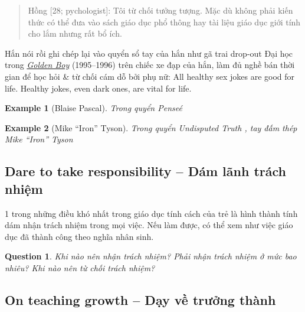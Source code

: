 \documentclass[12pt]{article}
\newtheorem{example}{Example}
\newtheorem{question}{Question}
\begin{document}
\begin{quote}
	{\sf Hồng [28; pychologist]}: Tôi từ chối tưởng tượng. Mặc dù không phải kiến thức có thể đưa vào sách giáo dục phổ thông hay tài liệu giáo dục giới tính cho lắm nhưng rất bổ ích.
\end{quote}
Hắn nói rồi ghi chép lại vào quyển sổ tay của hắn như gã trai drop-out Đại học trong \href{https://www.imdb.com/title/tt0159145/}{\it Golden Boy} (1995--1996) trên chiếc xe đạp của hắn, làm đủ nghề bán thời gian để học hỏi \& từ chối cám dỗ bởi phụ nữ: All healthy sex jokes are good for life. Healthy jokes, even dark ones, are vital for life.

\begin{example}[\sc Blaise Pascal]\rm
	Trong quyển {\it Pense\'e} \cite{Pascal2003}
\end{example}

\begin{example}[\sc Mike ``Iron'' Tyson]\rm
	Trong quyển {\it Undisputed Truth} \cite{Tyson_Sloman2013}, tay đấm thép Mike ``Iron'' Tyson
\end{example}

\subsection{Dare to take responsibility -- Dám lãnh trách nhiệm}
1 trong những điều khó nhất trong giáo dục tính cách của trẻ là hình thành tính dám nhận trách nhiệm trong mọi việc. Nếu làm được, có thể xem như việc giáo dục đã thành công theo nghĩa nhân sinh.

\begin{question}
	Khi nào nên nhận trách nhiệm? Phải nhận trách nhiệm ở mức bao nhiêu? Khi nào nên từ chối trách nhiệm?
\end{question}

\subsection{On teaching growth -- Dạy về trưởng thành}
\end{document}
